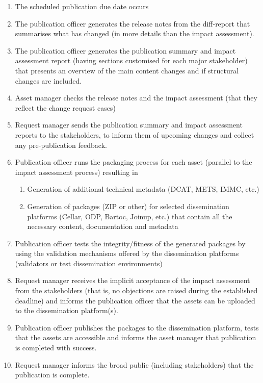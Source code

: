 	\begin{enumerate}
		\item The scheduled publication due date occurs
		\item The publication officer generates the release notes from the diff-report that summarises what has changed (in more details than the impact assessment).
		\item The publication officer generates the publication summary and impact assessment report (having sections customised for each major stakeholder) that presents an overview of the main content changes and if structural changes are included. 
		\item Asset manager checks the release notes and the impact assessment (that they reflect the change request cases)
		\item Request manager sends the publication summary and impact assessment reports to the stakeholders, to inform them of upcoming changes and collect any pre-publication feedback.
		\item Publication officer runs the packaging process for each asset (parallel to the impact assessment process) resulting in 
		\begin{enumerate}
			\item Generation of additional technical metadata (DCAT, METS, IMMC, etc.)
			\item Generation of packages (ZIP or other) for selected dissemination platforms (Cellar, ODP, Bartoc, Joinup, etc.) that contain all the necessary content, documentation and metadata
		\end{enumerate}
		\item Publication officer tests the integrity/fitness of the generated packages by using the validation mechanisms offered by the dissemination platforms (validators or test dissemination environments)
		\item Request manager receives the implicit acceptance of the impact assessment from the stakeholders (that is, no objections are raised during the established deadline) and informs the publication officer that the assets can be uploaded to the dissemination platform(s). 
		\item Publication officer publishes the packages to the dissemination platform, tests that the assets are accessible and informs the asset manager that publication is completed with success.
		\item Request manager informs the broad public (including stakeholders) that the publication is complete.
		
	\end{enumerate}
	
